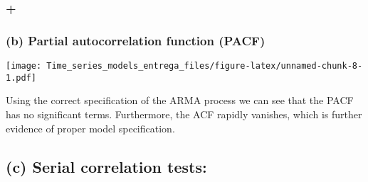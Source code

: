 \documentclass[]{article}
\newenvironment{Shaded}{\begin{snugshade}}{\end{snugshade}}
\newcommand{\AttributeTok}[1]{\textcolor[rgb]{0.77,0.63,0.00}{#1}}
\newcommand{\DecValTok}[1]{\textcolor[rgb]{0.00,0.00,0.81}{#1}}
\newcommand{\FunctionTok}[1]{\textcolor[rgb]{0.00,0.00,0.00}{#1}}
\newcommand{\NormalTok}[1]{#1}
\newcommand{\OtherTok}[1]{\textcolor[rgb]{0.56,0.35,0.01}{#1}}
\newcommand{\SpecialCharTok}[1]{\textcolor[rgb]{0.00,0.00,0.00}{#1}}
\newcommand{\StringTok}[1]{\textcolor[rgb]{0.31,0.60,0.02}{#1}}
\begin{document}
\hypertarget{section-1}{%
\subsubsection{+}\label{section-1}}

\hypertarget{b-partial-autocorrelation-function-pacf-1}{%
\subsubsection{\texorpdfstring{\textbf{(b)} Partial autocorrelation
function
(PACF)}{(b) Partial autocorrelation function (PACF)}}\label{b-partial-autocorrelation-function-pacf-1}}

\begin{Shaded}
\end{Shaded}

\texttt{[image: Time\_series\_models\_entrega\_files/figure-latex/unnamed-chunk-8-1.pdf]}

Using the correct specification of the ARMA process we can see that the
PACF has no significant terms. Furthermore, the ACF rapidly vanishes,
which is further evidence of proper model specification.

\hypertarget{c-serial-correlation-tests}{%
\subsection{\texorpdfstring{\textbf{(c)} Serial correlation
tests:}{(c) Serial correlation tests:}}\label{c-serial-correlation-tests}}
\end{document}
